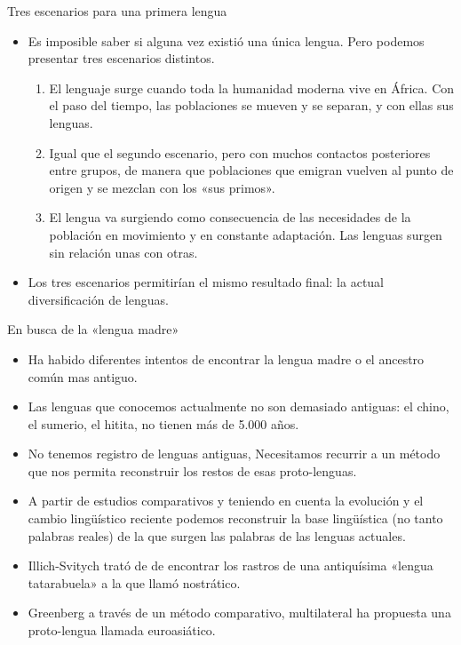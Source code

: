 \documentclass[handout]{beamer}
\begin{document}
\begin{frame}{Tres escenarios para una primera lengua}

\begin{itemize}
	\item Es imposible saber si alguna vez existió una única lengua. Pero podemos presentar tres escenarios distintos.

\begin{enumerate}
	\item El lenguaje surge cuando toda la humanidad moderna vive en África. Con el paso del tiempo, las poblaciones se mueven y se separan, y con ellas sus lenguas.
	\item Igual que el segundo escenario, pero con muchos contactos posteriores entre grupos, de manera que poblaciones que emigran vuelven al punto de origen y se mezclan con los «sus primos».
	\item El lengua va surgiendo como consecuencia de las necesidades de la población en movimiento y en constante adaptación. Las lenguas surgen sin relación unas con otras.
\end{enumerate}
	\item Los tres escenarios permitirían el mismo resultado final: la actual diversificación de lenguas.
\end{itemize}

\end{frame}


\begin{frame}{En busca de la «lengua madre»}
\begin{itemize}
	\item Ha habido diferentes intentos de encontrar la lengua madre o el ancestro común mas antiguo.
	\item Las lenguas que conocemos actualmente no son demasiado antiguas: el chino, el sumerio, el hitita, no tienen más de 5.000 años.
	\item No tenemos registro de lenguas antiguas, Necesitamos recurrir a un método que nos permita reconstruir los restos de esas proto-lenguas.
	\item A partir de estudios comparativos y teniendo en cuenta la evolución y el cambio lingüístico reciente podemos reconstruir la base lingüística (no tanto palabras reales) de la que surgen las palabras de las lenguas actuales.
	\item Illich-Svitych trató de de encontrar los rastros de una antiquísima «lengua tatarabuela» a la que llamó nostrático.
	\item Greenberg a través de un método comparativo, multilateral ha propuesta una proto-lengua llamada euroasiático.
\end{itemize}
\end{frame}
\end{document}
